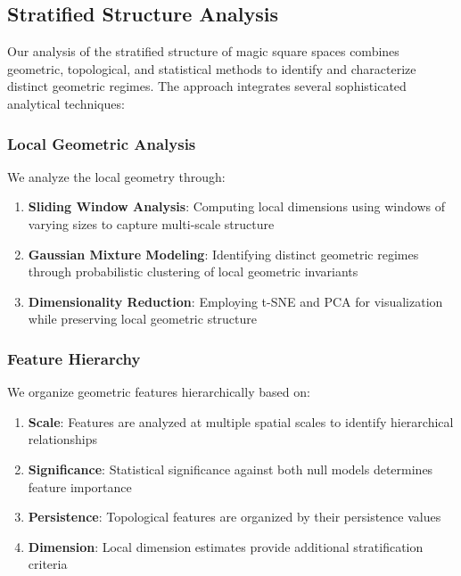 \subsection{Stratified Structure Analysis}
\label{subsec:stratification}

Our analysis of the stratified structure of magic square spaces combines geometric, topological, and statistical methods to identify and characterize distinct geometric regimes. The approach integrates several sophisticated analytical techniques:

\subsubsection{Local Geometric Analysis}

We analyze the local geometry through:

\begin{enumerate}
    \item \textbf{Sliding Window Analysis}: Computing local dimensions using windows of varying sizes to capture multi-scale structure
    \item \textbf{Gaussian Mixture Modeling}: Identifying distinct geometric regimes through probabilistic clustering of local geometric invariants
    \item \textbf{Dimensionality Reduction}: Employing t-SNE and PCA for visualization while preserving local geometric structure
\end{enumerate}

\subsubsection{Feature Hierarchy}

We organize geometric features hierarchically based on:

\begin{enumerate}
    \item \textbf{Scale}: Features are analyzed at multiple spatial scales to identify hierarchical relationships
    \item \textbf{Significance}: Statistical significance against both null models determines feature importance
    \item \textbf{Persistence}: Topological features are organized by their persistence values
    \item \textbf{Dimension}: Local dimension estimates provide additional stratification criteria
\end{enumerate}

